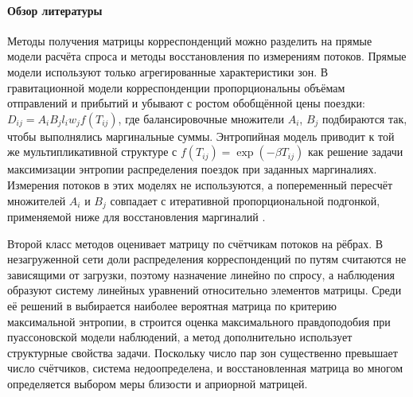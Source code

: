 \documentclass{crm-article}
\begin{document}
\paragraph{Обзор литературы}

Методы получения матрицы корреспонденций можно разделить на прямые модели расчёта спроса и
методы восстановления по измерениям потоков. Прямые модели используют только агрегированные характеристики зон. В гравитационной модели \cite{Isard1960} корреспонденции пропорциональны объёмам отправлений и прибытий и убывают с ростом обобщённой цены поездки: $D_{ij}=A_iB_jl_iw_jf(T_{ij})$, где балансировочные множители $A_i$, $B_j$ подбираются так, чтобы выполнялись
маргинальные суммы. Энтропийная модель \cite{Wilson1968} приводит к той же
мультипликативной структуре с $f(T_{ij})=\exp(-\beta T_{ij})$ как решение
задачи максимизации энтропии распределения поездок при заданных маргиналиях.
Измерения потоков в этих моделях не используются, а попеременный пересчёт
множителей $A_i$ и $B_j$ совпадает с итеративной пропорциональной подгонкой,
применяемой ниже для восстановления маргиналий \cite{SinkhornKnopp1967}.

Второй класс методов оценивает матрицу по счётчикам потоков на рёбрах. В
незагруженной сети доли распределения корреспонденций по путям считаются не
зависящими от загрузки, поэтому назначение линейно по спросу, а наблюдения
образуют систему линейных уравнений относительно элементов матрицы. Среди её
решений в \cite{VanZuylenWillumsen1980} выбирается наиболее вероятная матрица
по критерию максимальной энтропии, в \cite{Spiess1987} строится оценка
максимального правдоподобия при пуассоновской модели наблюдений, а метод
\cite{BierlaireToint1995} дополнительно использует структурные свойства
задачи. Поскольку число пар зон существенно превышает число счётчиков, система
недоопределена, и восстановленная матрица во многом определяется выбором меры
близости и априорной матрицей.
\end{document}
